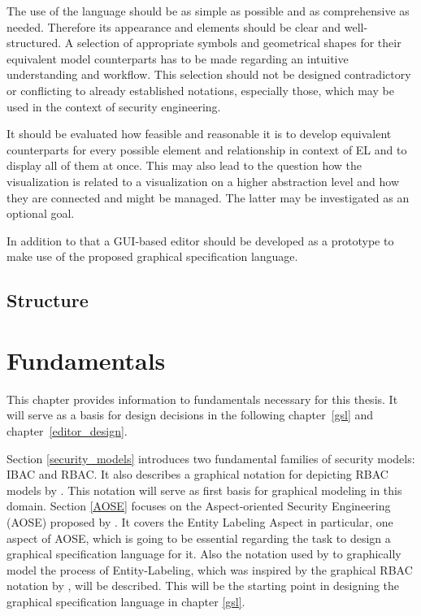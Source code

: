\documentclass[twoside, openright, 12pt]{book}
\begin{document}
The use of the language should be as simple as possible and as comprehensive as needed.
Therefore its appearance and elements should be clear and well-structured.
A selection of appropriate symbols and geometrical shapes for their equivalent model counterparts has to be made regarding an intuitive understanding and workflow.
This selection should not be designed contradictory or conflicting to already established notations, especially those, which may be used in the context of security engineering.

It should be evaluated how feasible and reasonable it is to develop equivalent counterparts for every possible element and relationship in context of EL and to display all of them at once.
This may also lead to the question how the visualization is related to a visualization on a higher abstraction level and how they are connected and might be managed.
The latter may be investigated as an optional goal.

In addition to that a GUI-based editor should be developed as a prototype to make use of the proposed graphical specification language.



\section{Structure}
\label{structure}




\cleardoublepage
\chapter{Fundamentals}
\label{fundamentals}
This chapter provides information to fundamentals necessary for this thesis.
It will serve as a basis for design decisions in the following chapter~\ref{gsl} and chapter~\ref{editor_design}.

Section \ref{security_models} introduces two fundamental families of security models: IBAC and RBAC.
It also describes a graphical notation for depicting RBAC models by \cite{Sandhu96}.
This notation will serve as first basis for graphical modeling in this domain.
Section \ref{AOSE} focuses on the Aspect-oriented Security Engineering (AOSE) proposed by \citet*{Amthor18}.
It covers the Entity Labeling Aspect in particular, one aspect of AOSE, which is going to be essential regarding the task to design a graphical specification language for it.
Also the notation used by \citet*{Amthor18} to graphically model the process of Entity-Labeling, which was inspired by the graphical RBAC notation by \cite{Sandhu96}, will be described.
This will be the starting point in designing the graphical specification language in chapter \ref{gsl}.
\end{document}
